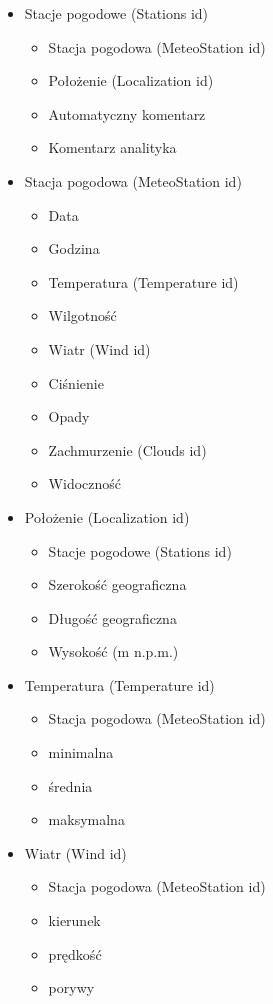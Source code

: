 \documentclass[12pt,a4paper]{article}
\begin{document}
\begin{itemize}
\small
\item Stacje pogodowe (Stations id)
    \begin{itemize}
	\item Stacja pogodowa (MeteoStation id)
	\item Położenie (Localization id)
    \item Automatyczny komentarz
    \item Komentarz analityka
    \end{itemize}
\item Stacja pogodowa (MeteoStation id)
    \begin{itemize}
    \item Data
    \item Godzina
    \item Temperatura (Temperature id)
    \item Wilgotność
    \item Wiatr (Wind id)
    \item Ciśnienie
    \item Opady
    \item Zachmurzenie (Clouds id)
    \item Widoczność
    \end{itemize}
\item Położenie (Localization id)
	\begin{itemize}
	\item Stacje pogodowe (Stations id)
	\item Szerokość geograficzna
    \item Długość geograficzna
    \item Wysokość (m n.p.m.)
	\end{itemize}
\item Temperatura (Temperature id)
    \begin{itemize}
    \item Stacja pogodowa (MeteoStation id)
    \item minimalna
    \item średnia
    \item maksymalna
    \end{itemize}
\item Wiatr (Wind id)
    \begin{itemize}
    \item Stacja pogodowa (MeteoStation id)
    \item kierunek
    \item prędkość
    \item porywy

\end{itemize}
\end{itemize}
\end{document}
